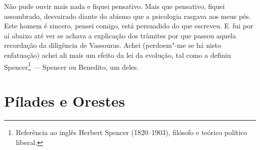 \begin{linenumbers}
Não pude ouvir mais nada e fiquei pensativo. Mais que pensativo, fiquei
assombrado, desvairado diante do abismo que a psicologia rasgava aos
meus pés. Este homem é sincero, pensei comigo, está persuadido do que
escreveu. E~fui por aí abaixo até ver se achava a explicação dos
trâmites por que passou aquela recordação da diligência de Vassouras.
Achei (perdoem"-me se há nisto enfatuação) achei ali mais um efeito da
lei da evolução, tal como a definiu Spencer\footnote{Referência ao
  inglês Herbert Spencer (1820--1903), filósofo e teórico político
  liberal.} --- Spencer ou Benedito, um deles.

\end{linenumbers}

\chapter{Pílades e Orestes}

